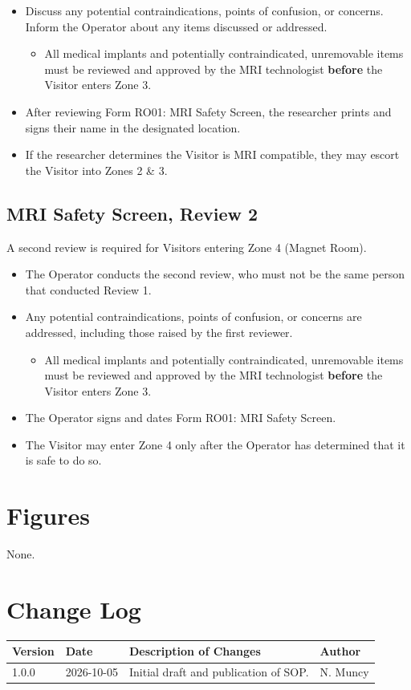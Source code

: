\documentclass[11pt]{article}
\begin{document}
\begin{itemize}
    \item Discuss any potential contraindications, points of confusion, or concerns. Inform the Operator about any items discussed or addressed.
    \begin{itemize}
        \item All medical implants and potentially contraindicated, unremovable items must be reviewed and approved by the MRI technologist \textbf{before} the Visitor enters Zone 3.
    \end{itemize}
    \item After reviewing Form RO01: MRI Safety Screen, the researcher prints and signs their name in the designated location.
    \item If the researcher determines the Visitor is MRI compatible, they may escort the Visitor into Zones 2 \& 3.
\end{itemize}

\subsection{MRI Safety Screen, Review 2}
\label{ssec:mri-rev2}
A second review is required for Visitors entering Zone 4 (Magnet Room).

\begin{itemize}
    \item The Operator conducts the second review, who must not be the same person that conducted Review 1.
    \item Any potential contraindications, points of confusion, or concerns are addressed, including those raised by the first reviewer.
    \begin{itemize}
        \item All medical implants and potentially contraindicated, unremovable items must be reviewed and approved by the MRI technologist \textbf{before} the Visitor enters Zone 3.
    \end{itemize}
    \item The Operator signs and dates Form RO01: MRI Safety Screen.
    \item The Visitor may enter Zone 4 only after the Operator has determined that it is safe to do so.
\end{itemize}


\section{Figures}

None.


\pagebreak

\section{Change Log}
\noindent
\begin{tabularx}{\textwidth}{@{} l l X l @{}}
\toprule
\textbf{Version} & \textbf{Date} & \textbf{Description of Changes} & \textbf{Author} \\
\midrule
1.0.0 & 2026-10-05 & Initial draft and publication of SOP. & N. Muncy \\

\bottomrule
\end{tabularx}
\end{document}
